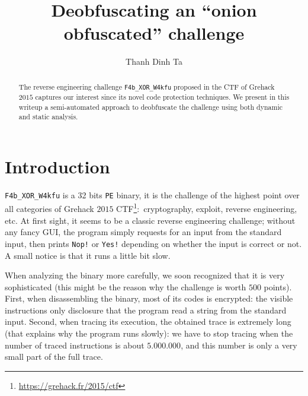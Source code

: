 \documentclass{easychair}
\begin{document}
\title{Deobfuscating an ``onion obfuscated'' challenge}

\author{
  Thanh Dinh Ta
}

\clearpage
\maketitle

\begin{abstract}
  The reverse engineering challenge \texttt{F4b\_XOR\_W4kfu} proposed in the CTF of Grehack $2015$ captures our interest since its novel code protection techniques. We present in this writeup a semi-automated approach to deobfuscate the challenge using both dynamic and static analysis.
\end{abstract}

\section{Introduction}
\label{sec:introduction}

\texttt{F4b\_XOR\_W4kfu} is a 32 bits \texttt{PE} binary, it is the challenge of the highest point over all categories of Grehack $2015$ CTF\footnote{\url{https://grehack.fr/2015/ctf}}:~cryptography, exploit, reverse engineering, etc. At first sight, it seems to be a classic reverse engineering challenge; without any fancy GUI, the program simply requests for an input from the standard input, then prints \texttt{Nop!} or \texttt{Yes!} depending on whether the input is correct or not. A small notice is that it runs a little bit slow.

When analyzing the binary more carefully, we soon recognized that it is very sophisticated (this might be the reason why the challenge is worth $500$ points). First, when disassembling the binary, most of its codes is encrypted: the visible instructions only disclosure that the program read a string from the standard input. Second, when tracing its execution, the obtained trace is extremely long (that explains why the program runs slowly): we have to stop tracing when the number of traced instructions is about $5.000.000$, and this number is only a very small part of the full trace.
\end{document}
